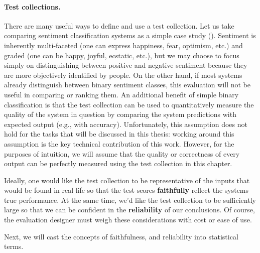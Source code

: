 \paragraph{Test collections.}
There are many useful ways to define and use a test collection.
Let us take comparing sentiment classification systems as a simple case study ().
Sentiment is inherently multi-faceted (one can express happiness, fear, optimism, etc.) and graded (one can be happy, joyful, ecstatic, etc.), but we may choose to focus simply on distinguishing between positive and negative sentiment because they are more objectively identified by people.
On the other hand, if most systems already distinguish between binary sentiment classes, this evaluation will not be useful in comparing or ranking them.
An additional benefit of simple binary classification is that the test collection can be used to quantitatively measure the quality of the system in question by comparing the system predictions with expected output (e.g., with accuracy).
Unfortunately, this assumption does not hold for the tasks that will be discussed in this thesis: working around this assumption is the key technical contribution of this work. 
However, for the purposes of intuition, we will assume that the quality or correctness of every output can be perfectly measured using the test collection in this chapter.

Ideally, one would like the test collection to be representative of the inputs that would be found in real life so that the test scores \textbf{faithfully} reflect the systems true performance.
At the same time, we'd like the test collection to be sufficiently large so that we can be confident in the \textbf{reliability} of our conclusions.
Of course, the evaluation designer must weigh these considerations with cost or ease of use.

Next, we will cast the concepts of faithfulness, and reliability into statistical terms.

